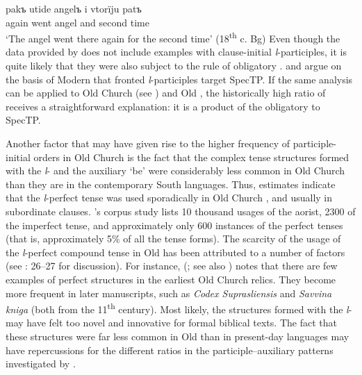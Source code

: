 \documentclass[output=paper,modfonts,newtxmath,hidelinks]{langscibook}
\begin{document}
\ea \label{11:ex20}
	\gll pakъ utide angelъ i vtorïju patъ\\
     again went angel and second time\\
	\glt `The angel went there again for the second time' \hfill (18\textsuperscript{th} c. Bg)
\z
Even though the  data provided by \citet[153--154]{pancheva2005} does not include examples with clause-initial \textit{l}{}-participles, it is quite likely that they were also subject to the rule of obligatory . \citet{broekhuis-migdalski2003} and \citet{migdalski2006} argue on the basis of Modern  that fronted \textit{l}{}-participles target SpecTP. If the same analysis can be applied to Old Church  (see \citealt{willis2000}) and Old , the historically high ratio of  receives a straightforward explanation: it is a product of the obligatory  to SpecTP.

Another factor that may have given rise to the higher frequency of participle-initial orders in Old Church  is the fact that the complex tense structures formed with the \textit{l}{}- and the auxiliary `be' were considerably less common in Old Church  than they are in the contemporary South  languages. Thus,  estimates indicate that the \textit{l}{}-perfect tense was used sporadically in Old Church , and usually in subordinate clauses. \citeauthor{dostal1954}’s corpus study lists 10 thousand usages of the aorist, 2300 of the imperfect tense, and approximately only 600 instances of the perfect tenses (that is, approximately 5\% of all the tense forms). The scarcity of the usage of the \textit{l}{}-perfect compound tense in Old  has been attributed to a number of factors (see \citealt{migdalski2006}: 26--27 for discussion). For instance, \citeauthor{bartula1981} (\citeyear[100]{bartula1981}; see also \citealt{damborsky1967}) notes that there are few examples of  perfect structures in the earliest Old Church  relics. They become more frequent in later manuscripts, such as \textit{Codex Suprasliensis} and \textit{Savvina kniga} (both from the 11\textsuperscript{th} century). Most likely, the structures formed with the \textit{l}{}- may have felt too novel and innovative for formal biblical texts. The fact that these structures were far less common in Old  than in present-day  languages may have repercussions for the different ratios in the participle--auxiliary patterns investigated by \citet{pancheva2008}.
\end{document}
